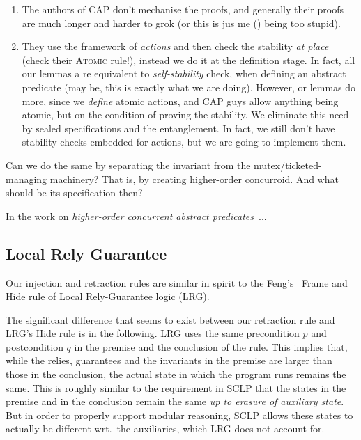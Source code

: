 \begin{enumerate}
\item The authors of CAP don't mechanise the proofs, and generally
  their proofs are much longer and harder to grok (or this is jus me
  (\is{}) being too stupid).

\item They use the framework of \emph{actions} and then check the
  stability \emph{at place} (check their \textsc{Atomic} rule!),
  instead we do it at the definition stage. In fact, all our lemmas a
  re equivalent to \emph{self-stability} check, when defining an
  abstract predicate (may be, this is exactly what we are
  doing). However, or lemmas do more, since we \emph{define} atomic
  actions, and CAP guys allow anything being atomic, but on the
  condition of proving the stability.  We eliminate this need by
  sealed specifications and the entanglement. In fact, we still don't
  have stability checks embedded for actions, but we are going to
  implement them.

\end{enumerate}

Can we do the same by separating the invariant from the
mutex/ticketed-managing machinery? That is, by creating higher-order
concurroid. And what should be its specification then? 

In the work on \emph{higher-order concurrent abstract
  predicates}~\cite{Svendsen-al:ESOP13}...

\subsection{Local Rely Guarantee}

Our injection and retraction rules are similar in spirit to the
Feng's~\cite{feng:popl09} Frame and Hide rule of Local Rely-Guarantee
logic (LRG). 

The significant difference that seems to exist between our retraction
rule and LRG's Hide rule is in the following. LRG uses the same
precondition $p$ and postcondition $q$ in the premise and the
conclusion of the rule. This implies that, while the relies,
guarantees and the invariants in the premise are larger than those in
the conclusion, the actual state in which the program runs remains the
same. This is roughly similar to the requirement in SCLP that the
states in the premise and in the conclusion remain the same \emph{up
  to erasure of auxiliary state}. But in order to properly support
modular reasoning, SCLP allows these states to actually be different
wrt.~the auxiliaries, which LRG does not account for.

